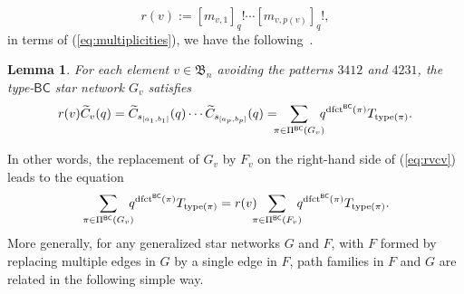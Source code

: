 \documentclass[12pt]{amsart}
\newtheorem{lem}[thm]{Lemma}
\theoremstyle{definition}
\numberwithin{equation}{section}
\newcommand{\bn}{\mathfrak{B}_n}
\newcommand{\wtc}[2]{\widetilde{C}_{#1}(#2)}
\newcommand{\defeq}{:=}
\newcommand{\dfct}{\mathrm{dfct}}
\newcommand{\type}{\mathrm{type}}
\newcommand{\avoidingp}{avoiding the patterns $3412$ and $4231${}}
\newcommand{\nTksp}{\negthickspace\negthickspace}
\newcommand{\PiBC}{\Pi^{\msfBC}}
\newcommand{\msfBC}{\mathsf{BC}}
\begin{document}
\begin{equation}\label{eq:rvdef}
    r(v) \defeq [m_{v,1}]_q! \cdots [m_{v,p(v)}]_q!,
\end{equation}
in terms of (\ref{eq:multiplicities}), we have the following~\cite[Thm.\,4.3]{SkanNNDCB}.
\begin{lem}\label{l:rvcv}
For each element $v \in \bn$ \avoidingp,
the type-$\msfBC$ star network $G_v$ satisfies
\begin{equation}\label{eq:rvcv}
        r(v) \wtc vq = 
        \wtc{s_{[a_1,b_1]}}q \cdots \wtc{s_{[a_p,b_p]}}q = \nTksp \sum_{\pi \in \PiBC(G_v)} \nTksp q^{\dfct^{\msfBC}(\pi)} T_{\type(\pi)}.
\end{equation}
\end{lem}
\noindent In other words, the replacement of $G_v$ by $F_v$ on the right-hand side of (\ref{eq:rvcv}) leads to the equation
\begin{equation}\label{eq:EFidentity}
    \sum_{\pi \in \PiBC(G_v)} \nTksp q^{\dfct^{\msfBC}(\pi)} T_{\type(\pi)} = 
    r(v) \nTksp
    \sum_{\pi \in \PiBC(F_v)} \nTksp q^{\dfct^{\msfBC}(\pi)} T_{\type(\pi)}.
\end{equation}
More generally, for any generalized star networks $G$ and $F$, with $F$ formed by replacing multiple edges in $G$ by a single %
edge in $F$, 
path families in $F$ and $G$ are related in the following simple way.
\end{document}
